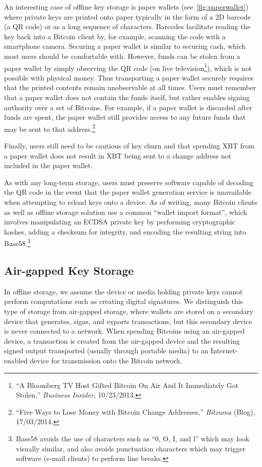 An interesting case of offline key storage is paper wallets (see~\ref{fig:paperwallet})
where private keys are printed onto paper typically in the form of a 2D barcode (\eg a QR code) or as a long sequence of characters. Barcodes facilitate reading the key back into a Bitcoin client by, for example, scanning the code with a smartphone camera. Securing a paper wallet is similar to securing cash, which most users should be comfortable with. However, funds can be stolen from a paper wallet by simply observing the QR code (\eg on live television\footnote{``A Bloomberg TV Host Gifted Bitcoin On Air And It Immediately Got Stolen,'' \textit{Business Insider}, 10/23/2013.}), which is not possible with physical money. Thus transporting a paper wallet securely requires that the printed contents remain unobservable at all times.  Users must remember that a paper wallet does not contain the funds itself, but rather enables signing authority over a set of Bitcoins. For example, if a paper wallet is discarded after funds are spent, the paper wallet still provides access to any future funds that may be sent to that address.\footnote{``Five Ways to Lose Money with Bitcoin Change Addresses,'' \textit{Bitzuma} (Blog), 17/03/2014.} 

Finally, users still need to be cautious of key churn and that spending XBT from a paper wallet does not result in XBT being sent to a change address not included in the paper wallet. 

As with any long-term storage, users must preserve software capable of decoding the QR code in the event that the paper wallet generation service is unavailable when attempting to reload keys onto a device. As of writing, many Bitcoin clients as well as offline storage solution use a common ``wallet import format'', which involves manipulating an ECDSA private key by performing cryptographic hashes, adding a checksum for integrity, and encoding the resulting string into Base58.\footnote{Base58 avoids the use of characters such as ``0, O, I, and l'' which may look visually similar, and also avoids punctuation characters which may trigger software (\eg e-mail clients) to perform line breaks.}

\subsection{Air-gapped Key Storage}
In offline storage, we assume the device or media holding private keys cannot perform computations such as creating digital signatures. We distinguish this type of storage from air-gapped storage, where wallets are stored on a secondary device that generates, signs, and exports transactions, but this secondary device is never connected to a network. When spending Bitcoins using an air-gapped device, a transaction is created from the air-gapped device and the resulting signed output transported (usually through portable media) to an Internet-enabled device for transmission onto the Bitcoin network. 

